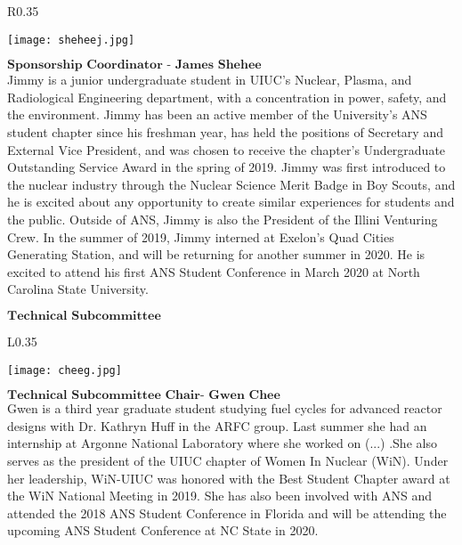 \setlength\intextsep{0pt}
\begin{wrapfigure}{R}{0.35\textwidth}
	\begin{center}
		\vspace{-\baselineskip}
		\texttt{[image: sheheej.jpg]}
	\end{center}
\end{wrapfigure}
$\textbf{Sponsorship Coordinator - James Shehee}$\\
Jimmy is a junior undergraduate student in UIUC's Nuclear, Plasma, and Radiological Engineering department, with a concentration in power, safety, and the environment. Jimmy has been an active member of the University's ANS student chapter since his freshman year, has held the positions of Secretary and External Vice President, and was chosen to receive the chapter's Undergraduate Outstanding Service Award in the spring of 2019. Jimmy was first introduced to the nuclear industry through the Nuclear Science Merit Badge in Boy Scouts, and he is excited about any opportunity to create similar experiences for students and the public. Outside of ANS, Jimmy is also the President of the Illini Venturing Crew. In the summer of 2019, Jimmy interned at Exelon's Quad Cities Generating Station, and will be returning for another summer in 2020. He is excited to attend his first ANS Student Conference in March 2020 at North Carolina State University.

$\textbf{Technical Subcommittee}$\\
\setlength\intextsep{0pt}
\begin{wrapfigure}{L}{0.35\textwidth}
	\begin{center}
		\vspace{-\baselineskip}
		\texttt{[image: cheeg.jpg]}
	\end{center}
\end{wrapfigure}
$\textbf{Technical Subcommittee Chair- Gwen Chee}$\\
Gwen is a third year graduate student studying fuel cycles for advanced reactor designs with Dr. Kathryn Huff in the ARFC group. Last summer she had an internship at Argonne National Laboratory where she worked on (...) .She also serves as the president of the UIUC chapter of Women In Nuclear (WiN). Under her leadership, WiN-UIUC was honored with the Best Student Chapter award at the WiN National Meeting in 2019. She has also been involved with ANS and attended the 2018 ANS Student Conference in Florida and will be attending the upcoming ANS Student Conference at NC State in 2020. 

